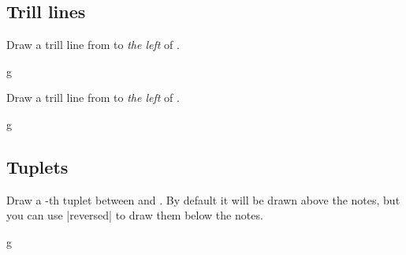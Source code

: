 \subsection{Trill lines}\label{sec:line:trill}
\begin{command}{\tmtrillline{}}
  Draw a trill line from  to \emph{the left} of .
\end{command}
\begin{codeexample}[]
\begin{tmline}
\begin{tmstaff}{g}{}
\end{tmstaff}
\end{tmline}
\end{codeexample}
\begin{command}{\tmtrilllinecoordinate{}}
  Draw a trill line from  to \emph{the left} of .
\end{command}
\begin{codeexample}[]
\begin{tmline}
\begin{tmstaff}{g}{}
\end{tmstaff}
\end{tmline}
\end{codeexample}
\subsection{Tuplets}\label{sec:line:tuplet}
\begin{command}{\tmtuplets{}}
  Draw a -th tuplet between  and . 
  By default it will be drawn above the notes, but you can use |reversed| to draw 
  them below the notes.
\end{command}
\begin{codeexample}[]
\begin{tmline}
\begin{tmstaff}{g}{}
  \begin{tmbeam}
  \end{tmbeam}
\end{tmstaff}
\end{tmline}
\end{codeexample}

